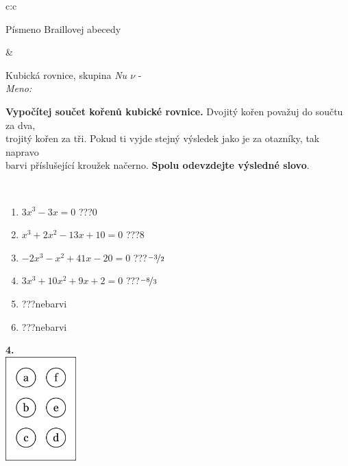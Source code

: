 \documentclass[10pt]{report}
\begin{document}
\begin{tabular}{c:c}
\begin{minipage}[c][104.5mm][t]{0.5\linewidth}
\begin{center}
\begin{minipage}{0.20\linewidth}
\begin{center}
{\small Písmeno Braillovej abecedy}
\end{center}
\end{minipage}
\end{center}
\end{minipage}
&
\begin{minipage}[c][104.5mm][t]{0.5\linewidth}
\begin{center}
\vspace{7mm}
{\huge Kubická rovnice, skupina \textit{Nu $\nu$} -}\\[5mm]
\textit{Meno:}\phantom{xxxxxxxxxxxxxxxxxxxxxxxxxxxxxxxxxxxxxxxxxxxxxxxxxxxxxxxxxxxxxxxxx}\\[5mm]
\begin{minipage}{0.95\linewidth}
\textbf{Vypočítej součet kořenů kubické rovnice.} Dvojitý kořen považuj do součtu za dva,\\trojitý kořen za tři. Pokud ti vyjde stejný výsledek jako je za otazníky, tak napravo\\barvi příslušející kroužek načerno. \textbf{Spolu odevzdejte výsledné slovo}.
\end{minipage}
\\[1mm]
\begin{minipage}{0.79\linewidth}
\begin{center}
\begin{varwidth}{\linewidth}
\begin{enumerate}
\Large
\item $3x^3-3x=0$\quad \dotfill\; ???\;\dotfill \quad $0$
\item $x^3+2x^2-13x+10=0$\quad \dotfill\; ???\;\dotfill \quad $8$
\item $-2x^3-x^2+41x-20=0$\quad \dotfill\; ???\;\dotfill \quad $\nicefrac{-3}{2}$
\item $3x^3+10x^2+9x+2=0$\quad \dotfill\; ???\;\dotfill \quad $\nicefrac{-8}{3}$
\item \quad \dotfill\; ???\;\dotfill \quad nebarvi
\item \quad \dotfill\; ???\;\dotfill \quad nebarvi
\end{enumerate}
\end{varwidth}
\end{center}
\end{minipage}
\begin{minipage}{0.20\linewidth}
\begin{center}
{\Huge\bfseries 4.} \\[2mm]
\includegraphics[height=40mm]{../images/braille.png}

\end{center}
\end{minipage}
\end{center}
\end{minipage}
\end{tabular}
\end{document}
